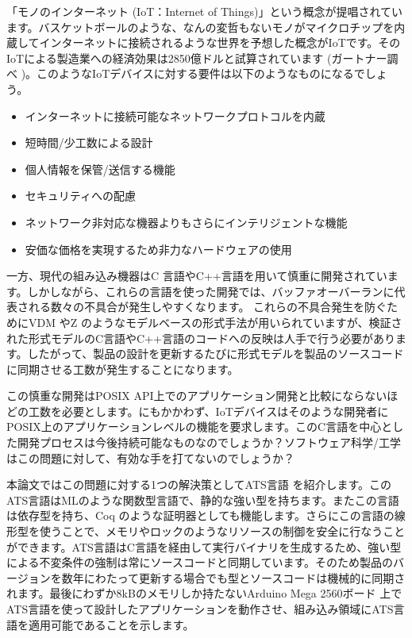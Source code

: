 \documentclass{ipsjprosym}
\begin{document}
「モノのインターネット (IoT：Internet of Things)」という概念が提唱されています。バスケットボールのような、なんの変哲もないモノがマイクロチップを内蔵してインターネットに接続されるような世界を予想した概念がIoTです。そのIoTによる製造業への経済効果は2850億ドルと試算されています (ガートナー調べ \cite{iot_monoist})。このようなIoTデバイスに対する要件は以下のようなものになるでしょう。

\begin{itemize}
\item インターネットに接続可能なネットワークプロトコルを内蔵
\item 短時間/少工数による設計
\item 個人情報を保管/送信する機能
\item セキュリティへの配慮
\item ネットワーク非対応な機器よりもさらにインテリジェントな機能
\item 安価な価格を実現するため非力なハードウェアの使用
\end{itemize}

一方、現代の組み込み機器はC 言語やC++言語を用いて慎重に開発されています。しかしながら、これらの言語を使った開発では、バッファオーバーランに代表される数々の不具合が発生しやすくなります。
これらの不具合発生を防ぐためにVDM \cite{vdm} やZ \cite{z_notation} のようなモデルベースの形式手法が用いられていますが、検証された形式モデルのC言語やC++言語のコードへの反映は人手で行う必要があります。したがって、製品の設計を更新するたびに形式モデルを製品のソースコードに同期させる工数が発生することになります。

この慎重な開発はPOSIX API上でのアプリケーション開発と比較にならないほどの工数を必要とします。にもかかわず、IoTデバイスはそのような開発者にPOSIX上のアプリケーションレベルの機能を要求します。このC言語を中心とした開発プロセスは今後持続可能なものなのでしょうか？ソフトウェア科学/工学はこの問題に対して、有効な手を打てないのでしょうか？

本論文ではこの問題に対する1つの解決策としてATS言語 \cite{ats} を紹介します。このATS言語はMLのような関数型言語で、静的な強い型を持ちます。またこの言語は依存型を持ち、Coq \cite{Coq_manual} のような証明器としても機能します。さらにこの言語の線形型を使うことで、メモリやロックのようなリソースの制御を安全に行なうことができます。ATS言語はC言語を経由して実行バイナリを生成するため、強い型による不変条件の強制は常にソースコードと同期しています。そのため製品のバージョンを数年にわたって更新する場合でも型とソースコードは機械的に同期されます。最後にわずか8kBのメモリしか持たないArduino Mega 2560ボード \cite{arduino-mega} 上でATS言語を使って設計したアプリケーションを動作させ、組み込み領域にATS言語を適用可能であることを示します。
\end{document}
